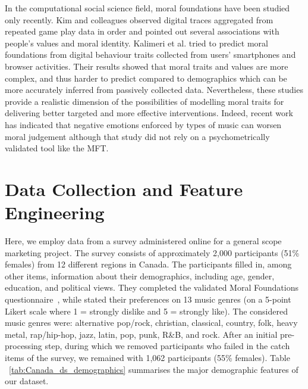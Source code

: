 \documentclass{article}
\begin{document}
In the computational social science field, moral foundations have been studied only recently. Kim and colleagues \cite{kim2013moral} observed digital traces aggregated from repeated game play data in order and pointed out several associations with people’s values and moral identity. Kalimeri et al. \cite{kalimeri2019human} tried to predict moral foundations from digital behaviour traits collected from users' smartphones and browser activities. Their results showed that moral traits and values are more complex, and thus harder to predict compared to demographics which can be more accurately inferred from passively collected data. Nevertheless, these studies provide a realistic dimension of the possibilities of modelling moral traits for delivering better targeted and more effective interventions. Indeed, recent work has indicated that negative emotions enforced by types of music can worsen moral judgement \cite{ansani2019you} although that study did not rely on a psychometrically validated tool like the MFT. 


\section{Data Collection and Feature Engineering}
\label{sec:headings}

Here, we employ data from a survey administered online for a general scope marketing project. The survey consists of approximately 2,000 participants (51\% females) from 12 different regions in Canada. The participants filled in, among other items, information about their demographics, including age, gender, education, and political views. They completed the validated Moral Foundations questionnaire~\cite{haidt2004intuitive}, while stated their preferences on 13 music genres (on a 5-point Likert scale where 1 = strongly dislike and 5 = strongly like). The considered music genres were: alternative pop/rock, christian, classical, country, folk, heavy metal, rap/hip-hop, jazz, latin, pop, punk, R\&B, and rock. 
After an initial pre-processing step, during which we removed participants who failed in the catch items of the survey, we remained with 1,062 participants
(55\% females). Table ~\ref{tab:Canada_ds_demographics} summarises the major demographic features of our dataset.

\end{document}
